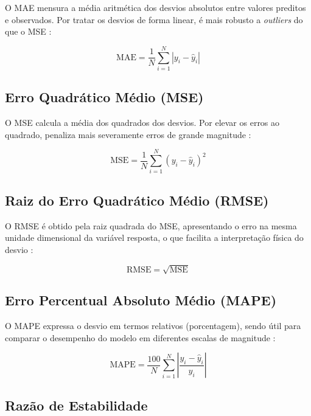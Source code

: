 O \ac{MAE} mensura a média aritmética dos desvios absolutos entre valores preditos e observados. Por tratar os desvios de forma linear, é mais robusto a \textit{outliers} do que o \ac{MSE} \cite{willmott2005advantages}:

\begin{equation}
\text{MAE} = \frac{1}{N} \sum_{i=1}^{N} |y_i - \hat{y}_i|
\label{eq:mae}
\end{equation}

\subsection{Erro Quadrático Médio (\ac{MSE})}

O \ac{MSE} calcula a média dos quadrados dos desvios. Por elevar os erros ao quadrado, penaliza mais severamente erros de grande magnitude \cite{bickel2015mathematical}:

\begin{equation}
\text{MSE} = \frac{1}{N} \sum_{i=1}^{N} (y_i - \hat{y}_i)^2
\label{eq:mse}
\end{equation}

\subsection{Raiz do Erro Quadrático Médio (\ac{RMSE})}

O \ac{RMSE} é obtido pela raiz quadrada do \ac{MSE}, apresentando o erro na mesma unidade dimensional da variável resposta, o que facilita a interpretação física do desvio \cite{chai2014root}:

\begin{equation}
\text{RMSE} = \sqrt{\text{MSE}}
\label{eq:rmse}
\end{equation}

\subsection{Erro Percentual Absoluto Médio (\ac{MAPE})}

O \ac{MAPE} expressa o desvio em termos relativos (porcentagem), sendo útil para comparar o desempenho do modelo em diferentes escalas de magnitude \cite{myttenaere2016mean}:

\begin{equation}
\text{MAPE} = \frac{100}{N} \sum_{i=1}^{N} \left| \frac{y_i - \hat{y}_i}{y_i} \right|
\label{eq:mape}
\end{equation}

\subsection{Razão de Estabilidade}

